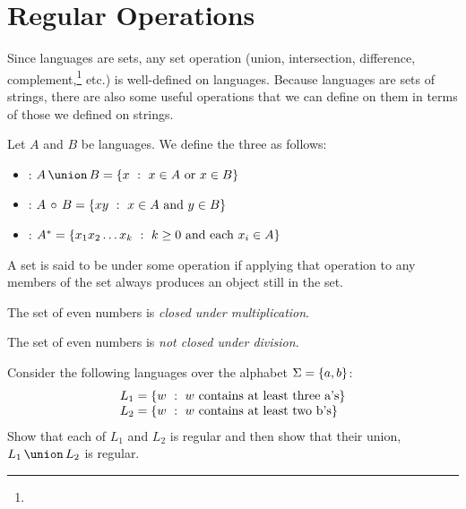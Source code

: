 \documentclass[twoside,letterpaper,openany]{book}
\begin{document}
\clearpage
\section{Regular Operations}

\begin{discussion}
Since languages are sets, any set operation (union, intersection, difference, complement,\footnote{} etc.) is well-defined on languages. Because languages are sets of strings, there are also some useful operations that we can define on them in terms of those we defined on strings.
\end{discussion}

\begin{defn}\label{def:regops}
Let $A$ and $B$ be languages. We define the three  as follows:
\begin{itemize}
\item {}: $\setunion A B = \setbuild{x}{x \in A~\textrm{or}~x \in B}$
\item {}: $A\,\circ\,B = \left\lbrace xy\ :\ x \in A~\textrm{and}~y \in B \right\rbrace$
\item {}: $A^{*} = \left\lbrace x_1 x_2 \ldots x_k\ :\ k \geq 0 ~\textrm{and each}~x_i \in A \right\rbrace$
\end{itemize}
\end{defn}

\begin{defn}[Closure]
A set is said to be  under some operation if applying that operation to any members of the set always produces an object still in the set.
\end{defn}

\begin{thm1}
The set of even numbers is \emph{closed under multiplication}.
\end{thm1}

\begin{thm1}
The set of even numbers is \emph{not closed under division}.
\end{thm1}

\begin{exer2}
Consider the following languages over the alphabet $\Sigma = \left\lbrace a, b \right\rbrace$:
\[\begin{array}{l}
L_1 = \left\lbrace w\ :\ w~\textrm{contains at least three a's} \right\rbrace \\
L_2 = \left\lbrace w\ :\ w~\textrm{contains at least two b's} \right\rbrace
\end{array}\]
Show that each of $L_1$ and $L_2$ is regular and then show that their union, $\setunion{L_1}{L_2}$ is regular.
\end{exer2}
\end{document}
